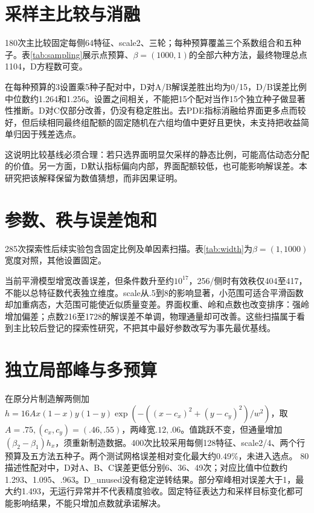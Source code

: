 \section{采样主比较与消融}
180次主比较固定每侧64特征、scale2、三轮；每种预算覆盖三个系数组合和五种子。表\ref{tab:sampling}展示点预算、$\beta=(1000,1)$的全部六种方法，最终物理总点1104，D方程数可变。
\begin{table}[htbp]\centering\caption{等物理点预算下采样与消融，五种子均值}\label{tab:sampling}\end{table}
在每种预算的3设置乘5种子配对中，D对A/B解误差胜出均为0/15，D/B误差比例中位数约1.264和1.256。设置之间相关，不能把15个配对当作15个独立种子做显著性推断。D对C仅部分改善，仍没有稳定胜出。去PDE指标消融给界面更多点而较好，但后续相同最终组配额的固定随机在六组均值中更好且更快，未支持把收益简单归因于残差选点。

这说明比较基线必须合理：若只选界面明显欠采样的静态比例，可能高估动态分配的价值。另一方面，D默认指标偏向内部，界面配额较低，也可能影响解误差。本研究把该解释保留为数值猜想，而非因果证明。

\section{参数、秩与误差饱和}
285次探索性后续实验包含固定比例及单因素扫描。表\ref{tab:width}为$\beta=(1,1000)$宽度对照，其他设置固定。
\begin{table}[htbp]\centering\caption{特征宽度敏感性，数据秩上限为总特征数}\label{tab:width}\end{table}
当前平滑模型增宽改善误差，但条件数升至约$10^{17}$，256/侧时有效秩仅404至417，不能以总特征数代表独立维度。scale从.5到8的影响显著，小范围可适合平滑函数却加重病态，大范围可能使近似质量变差。界面权重、岭和点数也改变排序：强岭增加偏差；点数216至1728的解误差不单调，物理通量却可改善。这些扫描属于看到主比较后登记的探索性研究，不把其中最好参数改写为事先最优基线。

\section{独立局部峰与多预算}
在原分片制造解两侧加$h=16A x(1-x)y(1-y)\exp(-((x-c_x)^2+(y-c_y)^2)/w^2)$，取$A=.75,(c_x,c_y)=(.46,.55)$，两峰宽$.12,.06$。值跳跃不变，但通量增加$(\beta_2-\beta_1)h_x$，须重新制造数据。400次比较采用每侧128特征、scale2/4、两个行预算及五方法五种子。两个测试网格误差相对变化最大约0.49\%，未进入选点。
80描述性配对中，D对A、B、C误差更低分别6、36、49次；对应比值中位数约1.293、1.095、.963。D\_unused没有稳定逆转结果。部分窄峰相对误差大于1，最大约1.493，无运行异常并不代表精度验收。固定特征表达力和采样目标变化都可能影响结果，不能只增加点数就承诺解决。

